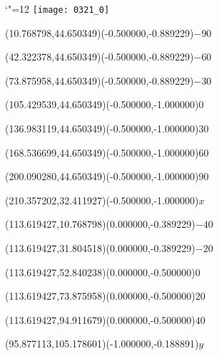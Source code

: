 \documentclass[12pt]{article}
\begin{document}
\makeatletter%
\let\ASYencoding\f@encoding%
\let\ASYfamily\f@family%
\let\ASYseries\f@series%
\let\ASYshape\f@shape%
\makeatother%
{\catcode`"=12%
\texttt{[image: 0321\_0]}%
}%
\kern -215.447780pt%
%
%
\fontsize{8.030000}{9.636000}\selectfont%
\usefont{\ASYencoding}{\ASYfamily}{\ASYseries}{\ASYshape}%
\ASYalign(10.768798,44.650349)(-0.500000,-0.889229){\vphantom{$10^4$}$-90$}%
%
%
\fontsize{8.030000}{9.636000}\selectfont%
\ASYalign(42.322378,44.650349)(-0.500000,-0.889229){\vphantom{$10^4$}$-60$}%
%
%
\fontsize{8.030000}{9.636000}\selectfont%
\ASYalign(73.875958,44.650349)(-0.500000,-0.889229){\vphantom{$10^4$}$-30$}%
%
%
\fontsize{8.030000}{9.636000}\selectfont%
\ASYalign(105.429539,44.650349)(-0.500000,-1.000000){\vphantom{$10^4$}$0$}%
%
%
\fontsize{8.030000}{9.636000}\selectfont%
\ASYalign(136.983119,44.650349)(-0.500000,-1.000000){\vphantom{$10^4$}$30$}%
%
%
\fontsize{8.030000}{9.636000}\selectfont%
\ASYalign(168.536699,44.650349)(-0.500000,-1.000000){\vphantom{$10^4$}$60$}%
%
%
\fontsize{8.030000}{9.636000}\selectfont%
\ASYalign(200.090280,44.650349)(-0.500000,-1.000000){\vphantom{$10^4$}$90$}%
%
%
\fontsize{12.000000}{14.400000}\selectfont%
\ASYalign(210.357202,32.411927)(-0.500000,-1.000000){$x$}%
%
%
\fontsize{8.030000}{9.636000}\selectfont%
\ASYalign(113.619427,10.768798)(0.000000,-0.389229){\vphantom{$10^4$}$-40$}%
%
%
\fontsize{8.030000}{9.636000}\selectfont%
\ASYalign(113.619427,31.804518)(0.000000,-0.389229){\vphantom{$10^4$}$-20$}%
%
%
\fontsize{8.030000}{9.636000}\selectfont%
\ASYalign(113.619427,52.840238)(0.000000,-0.500000){\vphantom{$10^4$}$0$}%
%
%
\fontsize{8.030000}{9.636000}\selectfont%
\ASYalign(113.619427,73.875958)(0.000000,-0.500000){\vphantom{$10^4$}$20$}%
%
%
\fontsize{8.030000}{9.636000}\selectfont%
\ASYalign(113.619427,94.911679)(0.000000,-0.500000){\vphantom{$10^4$}$40$}%
%
%
\fontsize{12.000000}{14.400000}\selectfont%
\ASYalign(95.877113,105.178601)(-1.000000,-0.188891){$y$}%
\end{document}
